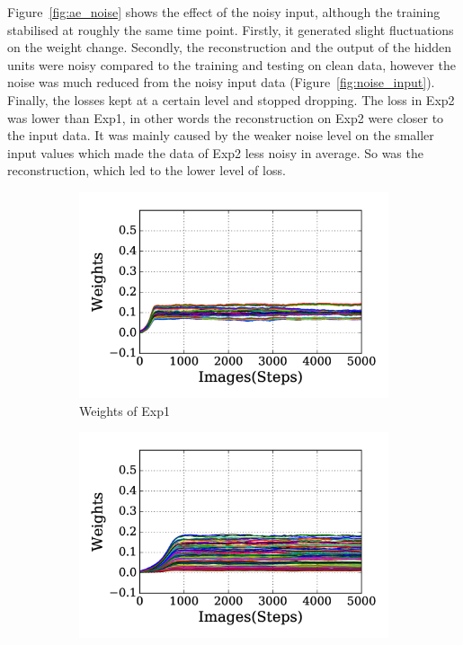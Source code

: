 Figure~\ref{fig:ae_noise} shows the effect of the noisy input, although the training stabilised at roughly the same time point.
Firstly, it generated slight fluctuations on the weight change.
Secondly, the reconstruction and the output of the hidden units were noisy compared to the training and testing on clean data, however the noise was much reduced from the noisy input data (Figure~\ref{fig:noise_input}). 
Finally, the losses kept at a certain level and stopped dropping.
The loss in Exp2 was lower than Exp1, in other words the reconstruction on Exp2 were closer to the input data.
It was mainly caused by the weaker noise level on the smaller input values which made the data of Exp2 less noisy in average.
So was the reconstruction, which led to the lower level of loss.
\begin{figure}
	\centering
	\begin{subfigure}[t]{0.45\textwidth}
		\includegraphics[width=\textwidth]{pics_sdlm/30_exp_RBM/exp1_weights_non.png}
		\caption{Weights of Exp1}
	\end{subfigure}
	\begin{subfigure}[t]{0.45\textwidth}
		\includegraphics[width=\textwidth]{pics_sdlm/30_exp_RBM/exp2_weights_non.png}

\end{subfigure}
\end{figure}
